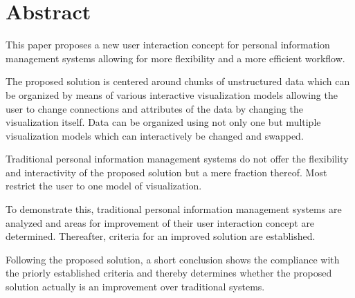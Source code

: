 \section*{Abstract}

\noindent This paper proposes a new user interaction concept for personal
information management systems allowing for more flexibility and a more
efficient workflow.

The proposed solution is centered around chunks of unstructured data which can
be organized by means of various interactive visualization models allowing the
user to change connections and attributes of the data by changing the
visualization itself. Data can be organized using not only one but multiple
visualization models which can interactively be changed and swapped.

Traditional personal information management systems do not offer the flexibility
and interactivity of the proposed solution but a mere fraction thereof. Most
restrict the user to one model of visualization.

To demonstrate this, traditional personal information management systems are
analyzed and areas for improvement of their user interaction concept are
determined. Thereafter, criteria for an improved solution are established.

Following the proposed solution, a short conclusion shows the compliance with
the priorly established criteria and thereby determines whether the proposed
solution actually is an improvement over traditional systems.
